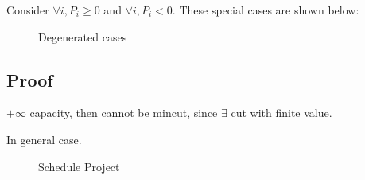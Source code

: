 \documentclass[a4paper]{report}
\theoremstyle{definition}
\begin{document}
Consider $\forall i, P_i \geq 0$ and $\forall i, P_i <0$. These special cases are shown below:

\begin{figure}[!htp]
\centering
{}
\caption{Degenerated cases}
\label{fig:scheduleprojectSpecial}
\end{figure}

\subsection{Proof}

$+\infty$ capacity, then cannot be mincut, since $\exists$ cut with finite value.

In general case.

\begin{figure}[!htp]
\centering
{}
\caption{Schedule Project}
\label{fig:scheduleproject}
\end{figure}
\end{document}
